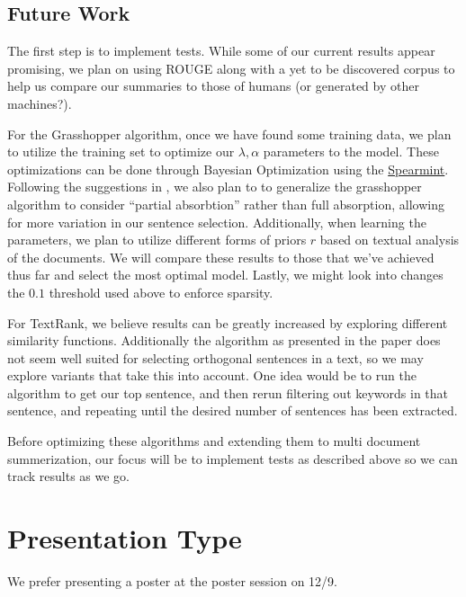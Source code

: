 \documentclass[10pt]{article}
\begin{document}
\subsection{Future Work}
\label{sec:future_work}
The first step is to implement tests. While some of our current results appear promising, we plan on using ROUGE \cite{rouge} along with a yet to be discovered corpus to help us compare our summaries to those of humans (or generated by other machines?).

For the Grasshopper algorithm, once we have found some training data, we plan to utilize the training set to optimize our $\lambda, \alpha$ parameters to the model. These optimizations can be done through Bayesian Optimization using the \href{https://github.com/HIPS/Spearmint}{Spearmint}. Following the suggestions in \cite{grasshopper}, we also plan to to generalize the grasshopper algorithm to consider ``partial absorbtion'' rather than full absorption, allowing for more variation in our sentence selection. Additionally, when learning the parameters, we plan to utilize different forms of priors $r$ based on textual analysis of the documents. We will compare these results to those that we've achieved thus far and select the most optimal model. Lastly, we might look into changes the $0.1$ threshold used above to enforce sparsity.

For TextRank, we believe results can be greatly increased by exploring different similarity functions. Additionally the algorithm as presented in the paper does not seem well suited for selecting orthogonal sentences in a text, so we may explore variants that take this into account. One idea would be to run the algorithm to get our top sentence, and then rerun filtering out keywords in that sentence, and repeating until the desired number of sentences has been extracted.

Before optimizing these algorithms and extending them to multi document summerization, our focus will be to implement tests as described above so we can track results as we go.

\section{Presentation Type}
We prefer presenting a poster at the poster session on 12/9.



\end{document}
